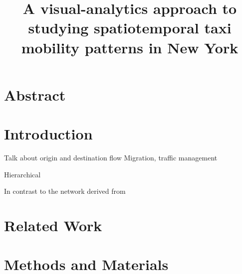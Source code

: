 \documentclass[a4paper,11pt]{article}
\begin{document}
\title{A visual-analytics approach to studying spatiotemporal taxi mobility patterns in New York}
\maketitle

\section*{\centering Abstract}



\section{Introduction}
Talk about origin and destination flow
Migration, traffic management


Hierarchical

In contrast to the network derived from 


\section{Related Work}

\section{Methods and Materials}
\end{document}
